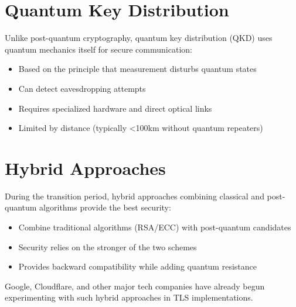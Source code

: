 \section{Quantum Key Distribution}
Unlike post-quantum cryptography, quantum key distribution (QKD) uses quantum mechanics itself for secure communication:

\begin{itemize}
    \item Based on the principle that measurement disturbs quantum states
    \item Can detect eavesdropping attempts
    \item Requires specialized hardware and direct optical links
    \item Limited by distance (typically <100km without quantum repeaters)
\end{itemize}


\section{Hybrid Approaches}
During the transition period, hybrid approaches combining classical and post-quantum algorithms provide the best security:

\begin{itemize}
    \item Combine traditional algorithms (RSA/ECC) with post-quantum candidates
    \item Security relies on the stronger of the two schemes
    \item Provides backward compatibility while adding quantum resistance
\end{itemize}

Google, Cloudflare, and other major tech companies have already begun experimenting with such hybrid approaches in TLS implementations.